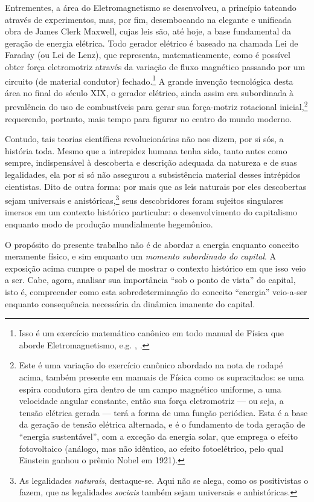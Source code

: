\documentclass[12pt]{article}
\numberwithin{equation}{section}
\theoremstyle{plain}
\theoremstyle{definition}
\theoremstyle{remark}
\begin{document}
Entrementes, a área do Eletromagnetismo se desenvolveu, a princípio tateando através de experimentos, mas, por fim, desembocando na elegante e unificada obra de James Clerk Maxwell, cujas leis são, até hoje, a base fundamental da geração de energia elétrica. Todo gerador elétrico é baseado na chamada Lei de Faraday (ou Lei de Lenz), que representa, matematicamente, como é possível obter força eletromotriz através da variação de fluxo magnético passando por um circuito (de material condutor) fechado.\footnote{Isso é um exercício matemático canônico em todo manual de Física que aborde Eletromagnetismo, e.g. \parencite[pp. 312-321]{Griffiths2013}, \parencite[pp. 67-71]{TongElectromag}.} A grande invenção tecnológica desta área no final do século XIX, o gerador elétrico, ainda assim era subordinada à prevalência do uso de combustíveis para gerar sua força-motriz rotacional inicial,\footnote{Este é uma variação do exercício canônico abordado na nota de rodapé acima, também presente em manuais de Física como os supracitados: se uma espira condutora gira dentro de um campo magnético uniforme, a uma velocidade angular constante, então sua força eletromotriz --- ou seja, a tensão elétrica gerada --- terá a forma de uma função periódica. Esta é a base da geração de tensão elétrica alternada, e é o fundamento de toda geração de ``energia sustentável'', com a exceção da energia solar, que emprega o efeito fotovoltaico (análogo, mas não idêntico, ao efeito fotoelétrico, pelo qual Einstein ganhou o prêmio Nobel em 1921).} requerendo, portanto, mais tempo para figurar no centro do mundo moderno.

Contudo, tais teorias científicas revolucionárias não nos dizem, por si sós, a história toda. Mesmo que a intrepidez humana tenha sido, tanto antes como sempre, indispensável à descoberta e descrição adequada da natureza e de suas legalidades, ela por si só não assegurou a subsistência material desses intrépidos cientistas. Dito de outra forma: por mais que as leis naturais por eles descobertas sejam universais e anistóricas,\footnote{As legalidades \emph{naturais}, destaque-se. Aqui não se alega, como os positivistas o fazem, que as legalidades \emph{sociais} também sejam universais e anhistóricas.} seus descobridores foram sujeitos singulares imersos em um contexto histórico particular: o desenvolvimento do capitalismo enquanto modo de produção mundialmente hegemônico.

O propósito do presente trabalho não é de abordar a energia enquanto conceito meramente físico, e sim enquanto um \emph{momento subordinado do capital}. A exposição acima cumpre o papel de mostrar o contexto histórico em que isso veio a ser. Cabe, agora, analisar sua importância ``sob o ponto de vista'' do capital, isto é, compreender como esta sobredeterminação do conceito ``energia'' veio-a-ser enquanto consequência necessária da dinâmica imanente do capital.
\end{document}
